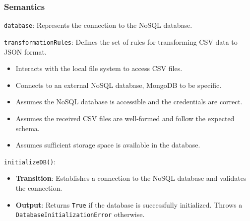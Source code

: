 \documentclass[12pt, titlepage]{article}
\begin{document}
\begin{description}
\subsubsection{Semantics}
\begin{description}
  \item[State Variables:]
  \item
  \texttt{database}: Represents the connection to the NoSQL database.
  \item
  \texttt{transformationRules}: Defines the set of rules for transforming CSV data to
  JSON format.
  \item[Environment Variables:]
  \item
  \begin{itemize}
    \item Interacts with the local file system to access CSV files.
  \end{itemize}
  \item 
  \begin{itemize}
    \item Connects to an external NoSQL database, MongoDB to be specific.
  \end{itemize}
  \item 

  \item[Assumptions:]
  \item
  \begin{itemize}
    \item Assumes the NoSQL database is accessible and the credentials are correct.
  \end{itemize}
  \item
  \begin{itemize}
    \item Assumes the received CSV files are well-formed and follow the expected schema.
  \end{itemize}
  \item 
  \begin{itemize}
    \item Assumes sufficient storage space is available in the database.
  \end{itemize}
  \item 

  \item[Access Routine Semantics:] 
  \item
  \texttt{initializeDB()}:
  \item
  \begin{itemize}
    \item \textbf{Transition}: Establishes a connection to the NoSQL database and validates
    the connection.
  \end{itemize}
  \item
  \begin{itemize}
    \item \textbf{Output}: Returns \texttt{True} if the database is successfully initialized.
    Throws a\\ \texttt{DatabaseInitializationError} otherwise.
  \end{itemize}
  \item 


\end{description}
\end{description}
\end{document}
